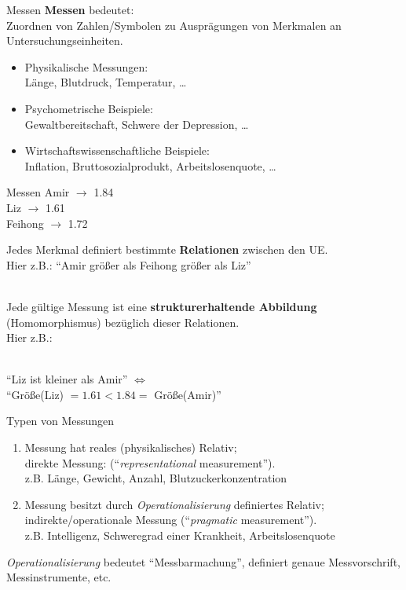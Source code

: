 \documentclass[
  10pt,
  ignorenonframetext,
]{beamer}
\providecommand{\tightlist}{%
  \setlength{\itemsep}{0pt}\setlength{\parskip}{0pt}}
\begin{document}
\begin{frame}{Messen}
\protect\hypertarget{messen-1}{}
\textbf{Messen} bedeutet:\\
Zuordnen von Zahlen/Symbolen zu Ausprägungen von Merkmalen an
Untersuchungseinheiten.

\begin{itemize}
\tightlist
\item
  Physikalische Messungen:\\
  Länge, Blutdruck, Temperatur, \ldots{}
\item
  Psychometrische Beispiele:\\
  Gewaltbereitschaft, Schwere der Depression, \ldots{}
\item
  Wirtschaftswissenschaftliche Beispiele:\\
  Inflation, Bruttosozialprodukt, Arbeitslosenquote, \ldots{}
\end{itemize}
\end{frame}

\begin{frame}{Messen}
\protect\hypertarget{messen-2}{}
Amir \(\longrightarrow\) 1.84\\
Liz \(\longrightarrow\) 1.61\\
Feihong \(\longrightarrow\) 1.72

Jedes Merkmal definiert bestimmte \textbf{Relationen} zwischen den UE.\\
Hier z.B.: ``Amir größer als Feihong größer als Liz''\\
\strut \\

Jede gültige Messung ist eine \textbf{strukturerhaltende Abbildung}
(Homomorphismus) bezüglich dieser Relationen.\\
Hier z.B.:\\
\strut \\

``Liz ist kleiner als Amir'' \(\iff\)\\
``Größe(Liz) \(= 1.61 < 1.84 =\) Größe(Amir)''
\end{frame}

\begin{frame}{Typen von Messungen}
\protect\hypertarget{typen-von-messungen}{}
\begin{enumerate}
\tightlist
\item
  Messung hat reales (physikalisches) Relativ;\\
  direkte Messung: (``\emph{representational} measurement'').\\
  z.B. Länge, Gewicht, Anzahl, Blutzuckerkonzentration
\item
  Messung besitzt durch \emph{Operationalisierung} definiertes
  Relativ;\\
  indirekte/operationale Messung (``\emph{pragmatic} measurement'').\\
  z.B. Intelligenz, Schweregrad einer Krankheit, Arbeitslosenquote
\end{enumerate}

\emph{Operationalisierung} bedeutet ``Messbarmachung'', definiert genaue
Messvorschrift, Messinstrumente, etc.
\end{frame}
\end{document}
